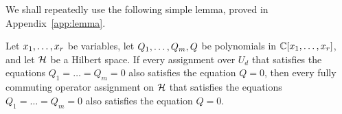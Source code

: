 We shall repeatedly use the following simple lemma, proved in Appendix~\ref{app:lemma}.

\begin{lemma}\label{lem:lemma-3}
Let $x _1,\ldots, x _{r}$ be variables, let $Q _1,\ldots, Q _{m},Q$ be polynomials in ${\mathbb C}[x _1,\ldots, x _{r}]$,
and let ${\mathcal H}$ be a Hilbert space. If every assignment over $U_d$ that 
satisfies the equations $Q_1=\dots=Q_m=0$ also satisfies the equation
$Q=0$, then every fully commuting operator assignment on ${\mathcal H}$ that 
satisfies the equations $Q_1=\dots=Q_m=0$ also satisfies the equation
$Q=0$.
\end{lemma}



